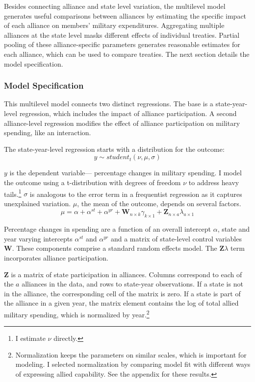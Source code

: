 \documentclass[12pt]{article}
\begin{document}
Besides connecting alliance and state level variation, the multilevel model generates useful comparisons between alliances by estimating the specific impact of each alliance on members' military expenditures. 
Aggregating multiple alliances at the state level masks different effects of individual treaties. 
Partial pooling of these alliance-specific parameters generates reasonable estimates for each alliance, which can be used to compare treaties. 
The next section details the model specification. 
 


\subsubsection{Model Specification} 

This multilevel model connects two distinct regressions. 
The base is a state-year-level regression, which includes the impact of alliance participation.
A second alliance-level regression modifies the effect of alliance participation on military spending, like an interaction. 


The state-year-level regression starts with a distribution for the outcome:
\begin{equation}
y \sim student_t(\nu, \mu, \sigma)
\end{equation}
 

$y$ is the dependent variable--- percentage changes in military spending. 
I model the outcome using a t-distribution with degrees of freedom $\nu$ to address heavy tails.\footnote{I estimate $\nu$ directly.}
$\sigma$ is analogous to the error term in a frequentist regression as it captures unexplained variation.  
$\mu$, the mean of the outcome, depends on several factors.
\begin{equation}
\mu = \alpha + \alpha^{st} + \alpha^{yr} +\textbf{W}_{n \times k} \gamma_{k \times 1}  + \textbf{Z}_{n \times a} \lambda_{a \times 1} 
\end{equation}


Percentage changes in spending are a function of an overall intercept $\alpha$, state and year varying intercepts $\alpha^{st}$ and $\alpha^{yr}$ and a matrix of state-level control variables $\textbf{W}$.
These components comprise a standard random effects model. 
The $\textbf{Z} \lambda$ term incorporates alliance participation.


$\textbf{Z}$ is a matrix of state participation in alliances. 
Columns correspond to each of the $a$ alliances in the data, and rows to state-year observations. 
If a state is not in the alliance, the corresponding cell of the matrix is zero.
If a state is part of the alliance in a given year, the matrix element contains the log of total allied military spending, which is normalized by year.\footnote{Normalization keeps the parameters on similar scales, which is important for modeling. I selected normalization by comparing model fit with different ways of expressing allied capability. See the appendix for these results.} 
\end{document}
